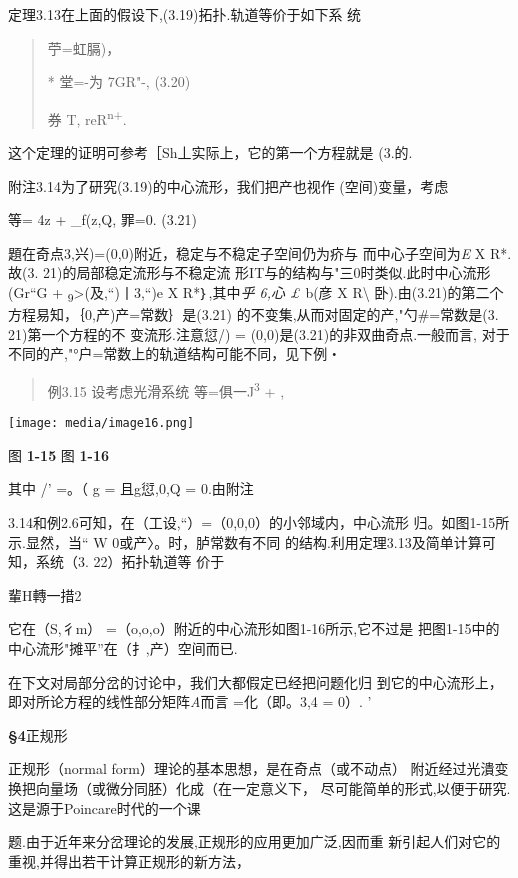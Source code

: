 \documentclass{article}
\begin{document}
定理3.13在上面的假设下,(3.19)拓扑.轨道等价于如下系 统

\begin{quote}
苧=虹膈)，

* 堂=-为 7GR"-, (3.20)

券 T, reR\textsuperscript{n+}.
\end{quote}

这个定理的证明可参考［Sh丄实际上，它的第一个方程就是 (3.的.

附注3.14为了研究(3.19)的中心流形，我们把产也视作 (空间)变量，考虑

等= 4z + \_f(z,Q, 罪=0. (3.21)

題在奇点3,兴)=(0,0)附近，稳定与不稳定子空间仍为疥与
而中心子空间为\emph{E} X R*.故(3. 21)的局部稳定流形与不稳定流
形IT与的结构与"三0时类似.此时中心流形(Gr``G +
\textsubscript{9}\textgreater{}(及,``)丨3,``)e X R*｝,其中\emph{乎 6,心
£} b(彦 X R\textbackslash{}
卧).由(3.21)的第二个方程易知，｛0,产)\textbar{}产=常数｝是(3.21)
的不变集,从而对固定的产,"勺\#=常数是(3. 21)第一个方程的不
变流形.注意愆/) = (0,0)是(3.21)的非双曲奇点.一般而言,
对于不同的产,"°\textbar{}户=常数上的轨道结构可能不同，见下例・

\begin{quote}
例3.15 设考虑光滑系统 等=俱一J\textsuperscript{3} + ,
\end{quote}

\texttt{[image: media/image16.png]}

图 \textbf{1-15} 图 \textbf{1-16}

其中 /' =。（ g = 且g愆,0,Q = 0.由附注

3.14和例2.6可知，在（工设,``）=（0,0,0）的小邻域内，中心流形
归。如图1-15所示.显然，当`` W 0或产〉。时，胪常数有不同
的结构.利用定理3.13及简单计算可知，系统（3. 22）拓扑轨道等 价于

輩H轉一措2

它在（S,彳m） =（o,o,o）附近的中心流形如图1-16所示,它不过是
把图1-15中的中心流形"摊平''在（扌,产）空间而已.

在下文对局部分岔的讨论中，我们大都假定已经把问题化归
到它的中心流形上，即对所论方程的线性部分矩阵\emph{A}而言 =化（即。3,4 =
0）. '

\protect\hypertarget{bookmark32}{}{}\textbf{§4}正规形

正规形（normal form）理论的基本思想，是在奇点（或不动点）
附近经过光潰变换把向量场（或微分同胚）化成（在一定意义下，
尽可能简单的形式,以便于研究.这是源于Poincare时代的一个课

题.由于近年来分岔理论的发展,正规形的应用更加广泛,因而重
新引起人们对它的重视,并得出若干计算正规形的新方法，
\end{document}
